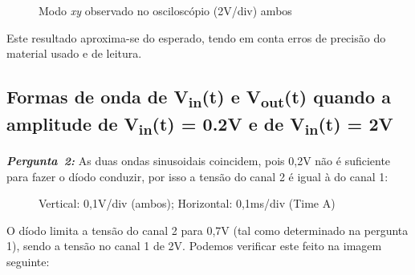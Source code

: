 \documentclass[pdftex,12pt,a4paper]{report}
\begin{document}
\begin{figure}[h]
\centerline{}
\caption{Modo \textit{xy} observado no osciloscópio (2V/div) ambos}\label{grafico_1c_osciloscopio}
\end{figure}

Este resultado aproxima-se do esperado, tendo em conta erros de precisão do material usado e de leitura.

\subsection{Formas de onda de V\textsubscript{in}(t)  e V\textsubscript{out}(t) quando a amplitude de V\textsubscript{in}(t) = 0.2V e de V\textsubscript{in}(t) = 2V}
\hbox{\emph{\textbf{Pergunta 2:}}\newline}
As duas ondas sinusoidais coincidem, pois 0,2V não é suficiente para fazer o díodo conduzir, por isso a tensão do canal 2 é igual à do canal 1:

\begin{figure}[h]
\centerline{}
\caption{Vertical: 0,1V/div (ambos); Horizontal: 0,1ms/div (Time A)}\label{grafico_12_02_osciloscopio}
\end{figure}

O díodo limita a tensão do canal 2 para 0,7V (tal como determinado na pergunta 1), sendo a tensão no canal 1 de 2V. Podemos verificar este feito na imagem seguinte:
\end{document}
